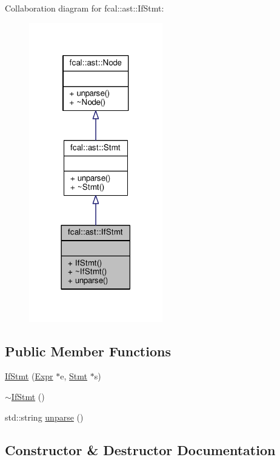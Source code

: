 Collaboration diagram for fcal\+:\+:ast\+:\+:If\+Stmt\+:
\nopagebreak
\begin{figure}[H]
\begin{center}
\leavevmode
\includegraphics[width=165pt]{classfcal_1_1ast_1_1IfStmt__coll__graph}
\end{center}
\end{figure}
\subsection*{Public Member Functions}
\begin{DoxyCompactItemize}
\item 
\hyperlink{classfcal_1_1ast_1_1IfStmt_a3f91ac7fda63ae79747f5e323c313cc0}{If\+Stmt} (\hyperlink{classfcal_1_1ast_1_1Expr}{Expr} $\ast$e, \hyperlink{classfcal_1_1ast_1_1Stmt}{Stmt} $\ast$s)
\item 
\hyperlink{classfcal_1_1ast_1_1IfStmt_a71d8b2cac8904cde52e99c81ad23ae6f}{$\sim$\+If\+Stmt} ()
\item 
std\+::string \hyperlink{classfcal_1_1ast_1_1IfStmt_acf7d0fbe7a9ff597216a23992f603062}{unparse} ()
\end{DoxyCompactItemize}


\subsection{Constructor \& Destructor Documentation}
